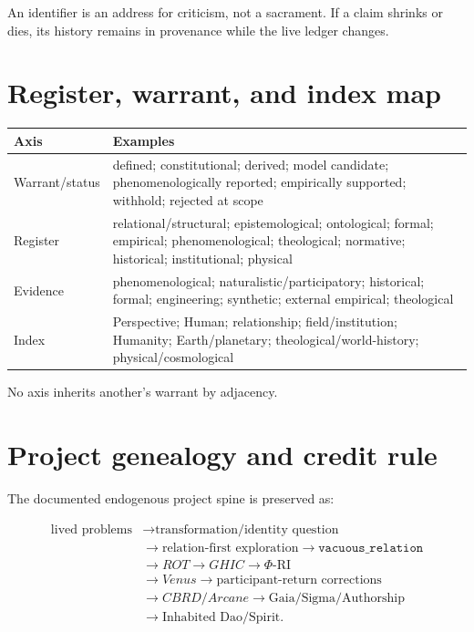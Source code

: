 \documentclass[11pt]{article}
\begin{document}
An identifier is an address for criticism, not a sacrament. If a claim shrinks or dies, its history remains in provenance while the live ledger changes.

\section{Register, warrant, and index map}

\begin{center}
\begin{tabularx}{0.96\textwidth}{l>{\raggedright\arraybackslash}X}
\toprule
Axis & Examples \\
\midrule
Warrant/status & defined; constitutional; derived; model candidate; phenomenologically reported; empirically supported; withhold; rejected at scope \\
Register & relational/structural; epistemological; ontological; formal; empirical; phenomenological; theological; normative; historical; institutional; physical \\
Evidence & phenomenological; naturalistic/participatory; historical; formal; engineering; synthetic; external empirical; theological \\
Index & Perspective; Human; relationship; field/institution; Humanity; Earth/planetary; theological/world-history; physical/cosmological \\
\bottomrule
\end{tabularx}
\end{center}

No axis inherits another's warrant by adjacency.

\section{Project genealogy and credit rule}

The documented endogenous project spine is preserved as:

\begin{equation}
\begin{aligned}
\text{lived problems}
&\rightarrow\text{transformation/identity question}\\
&\rightarrow\text{relation-first exploration}
\rightarrow\texttt{vacuous\_relation}\\
&\rightarrow ROT\rightarrow GHIC\rightarrow\Phi\text{-RI}\\
&\rightarrow Venus\rightarrow\text{participant-return corrections}\\
&\rightarrow CBRD/Arcane\rightarrow\text{Gaia/Sigma/Authorship}\\
&\rightarrow\text{Inhabited Dao/Spirit}.
\end{aligned}
\end{equation}
\end{document}
